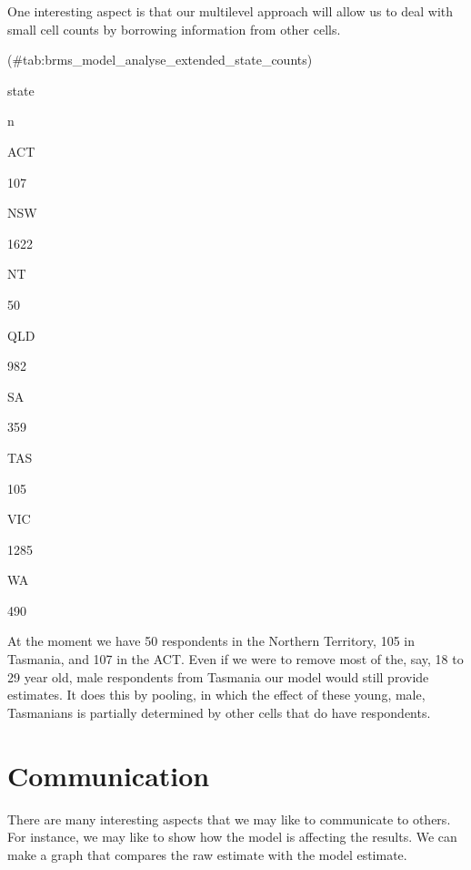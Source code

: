 \documentclass[
]{book}
\newenvironment{Shaded}{\begin{snugshade}}{\end{snugshade}}
\newcommand{\KeywordTok}[1]{\textcolor[rgb]{0.13,0.29,0.53}{\textbf{#1}}}
\newcommand{\NormalTok}[1]{#1}
\newcommand{\OperatorTok}[1]{\textcolor[rgb]{0.81,0.36,0.00}{\textbf{#1}}}
\newcommand{\StringTok}[1]{\textcolor[rgb]{0.31,0.60,0.02}{#1}}
\begin{document}
One interesting aspect is that our multilevel approach will allow us to deal with small cell counts by borrowing information from other cells.

\begin{Shaded}
\end{Shaded}

(\#tab:brms\_model\_analyse\_extended\_state\_counts)

state

n

ACT

107

NSW

1622

NT

50

QLD

982

SA

359

TAS

105

VIC

1285

WA

490

At the moment we have 50 respondents in the Northern Territory, 105 in Tasmania, and 107 in the ACT. Even if we were to remove most of the, say, 18 to 29 year old, male respondents from Tasmania our model would still provide estimates. It does this by pooling, in which the effect of these young, male, Tasmanians is partially determined by other cells that do have respondents.

\hypertarget{communication}{%
\section{Communication}\label{communication}}

There are many interesting aspects that we may like to communicate to others. For instance, we may like to show how the model is affecting the results. We can make a graph that compares the raw estimate with the model estimate.
\end{document}
